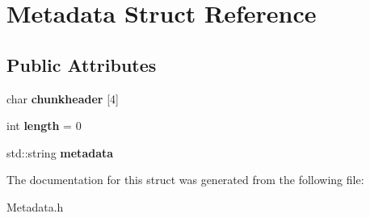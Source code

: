 \hypertarget{structMetadata}{}\section{Metadata Struct Reference}
\label{structMetadata}
\subsection*{Public Attributes}
\begin{DoxyCompactItemize}
\item 
\mbox{\label{structMetadata_a56e1b5e5cc34bff007a4ead46e34977b}} 
char {\bfseries chunkheader} \mbox{[}4\mbox{]}
\item 
\mbox{\label{structMetadata_a4749c57058b86abf3cca7ddb4a2d88f6}} 
int {\bfseries length} = 0
\item 
\mbox{\label{structMetadata_abab8797413cddcea684f3159a08cd25e}} 
std\+::string {\bfseries metadata}
\end{DoxyCompactItemize}


The documentation for this struct was generated from the following file\+:\begin{DoxyCompactItemize}
\item 
Metadata.\+h\end{DoxyCompactItemize}
